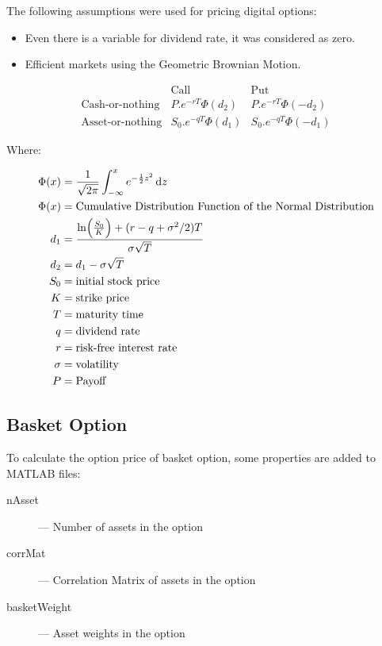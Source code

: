 \documentclass[]{elsarticle}
\theoremstyle{definition}
\theoremstyle{remark}
\begin{document}
The following assumptions were used for pricing digital options:
\begin{itemize}
\item Even there is a variable for dividend rate, it was considered as zero.
\item Efficient markets using the Geometric Brownian Motion.
\end{itemize}

$$\begin{array}{rcc}
& \text{Call}  & \text{Put} \\
\text{Cash-or-nothing} & P.e^{-rT}\Phi(d_2) & P.e^{-rT}\Phi(-d_2) \\
\text{Asset-or-nothing} & S_0.e^{-qT}\Phi(d_1) & S_0.e^{-qT}\Phi(-d_1)
\end{array}$$

Where:

\begin{align*}
\Phi(x) & =\frac{1}{\sqrt{2\pi}}\int_{-\infty}^{x}e^{-\frac{1}{2}z^2} \, 
{\rm
d}z \\
\Phi(x) & = \text{Cumulative Distribution Function of the Normal 
Distribution} \\ 
d_1 &=\frac{\ln \Bigl(\frac{S_0}{K} \Bigr)+(r-q+\sigma^2/2)T}
{\sigma\sqrt{T}} \\
d_2 &=d_1-\sigma\sqrt{T} \\
S_0 & = \text{initial stock price} \\
K & = \text{strike price}\\
T & = \text{maturity time}\\
q & = \text{dividend rate}\\
r & = \text{risk-free interest rate}\\
\sigma & = \text{volatility}\\
P & = \text{Payoff}\\
\end{align*}

\subsection{Basket Option}
To calculate the option price of basket option, some properties are added to MATLAB files:
\begin{description}
\item[nAsset]--- Number of assets in the option
\item[corrMat]--- Correlation Matrix of assets in the option
\item[basketWeight]--- Asset weights in the option 
\end{description}
\end{document}
